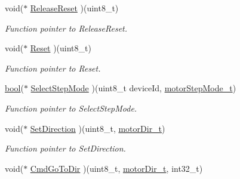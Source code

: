 \begin{DoxyCompactItemize}
void($\ast$ \mbox{\hyperlink{structmotor_drv__t_ae50b1207bc65c89404e298b77838d5cd}{Release\+Reset}} )(uint8\+\_\+t)
\begin{DoxyCompactList}\small\item\em Function pointer to Release\+Reset. \end{DoxyCompactList}\item 
\mbox{\label{structmotor_drv__t_a4c3fa1c0b2525a2955145b2c44aaf709}} 
void($\ast$ \mbox{\hyperlink{structmotor_drv__t_a4c3fa1c0b2525a2955145b2c44aaf709}{Reset}} )(uint8\+\_\+t)
\begin{DoxyCompactList}\small\item\em Function pointer to Reset. \end{DoxyCompactList}\item 
\mbox{\label{structmotor_drv__t_a7ed3f01e448af663c648f683f6f5bbf5}} 
\mbox{\hyperlink{group___motor___boolean___type_ga0ecf26b576b9a54eca656b9be7ba6a06}{bool}}($\ast$ \mbox{\hyperlink{structmotor_drv__t_a7ed3f01e448af663c648f683f6f5bbf5}{Select\+Step\+Mode}} )(uint8\+\_\+t device\+Id, \mbox{\hyperlink{group___device___step__mode_gaa8024e6a2453b22a104bd0a8a364dd80}{motor\+Step\+Mode\+\_\+t}})
\begin{DoxyCompactList}\small\item\em Function pointer to Select\+Step\+Mode. \end{DoxyCompactList}\item 
\mbox{\label{structmotor_drv__t_ab395a249ba7262f9393388ef3b963e74}} 
void($\ast$ \mbox{\hyperlink{structmotor_drv__t_ab395a249ba7262f9393388ef3b963e74}{Set\+Direction}} )(uint8\+\_\+t, \mbox{\hyperlink{group___device___direction___options_ga4eaf4196e4d11d552f58f3fab218a8c7}{motor\+Dir\+\_\+t}})
\begin{DoxyCompactList}\small\item\em Function pointer to Set\+Direction. \end{DoxyCompactList}\item 
\mbox{\label{structmotor_drv__t_ab0f482884de040dc97d4c348d5ec5308}} 
void($\ast$ \mbox{\hyperlink{structmotor_drv__t_ab0f482884de040dc97d4c348d5ec5308}{Cmd\+Go\+To\+Dir}} )(uint8\+\_\+t, \mbox{\hyperlink{group___device___direction___options_ga4eaf4196e4d11d552f58f3fab218a8c7}{motor\+Dir\+\_\+t}}, int32\+\_\+t)

\end{DoxyCompactItemize}

